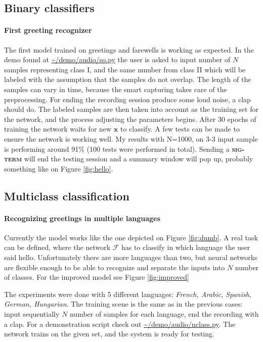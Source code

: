 \subsection{Binary classifiers}
\paragraph{First greeting recognizer}
The first model trained on greetings and farewells is working as expected. In the demo found at \cite{DV} \url{~/demo/audio/so.py} the user is asked to input number of $N$ samples representing class I, and the same number from class II which will be labeled with the assumption that the samples do not overlap. The length of the samples can vary in time, because the smart capturing takes care of the preprocessing. 
For ending the recording session produce some loud noise, a clap should do. 
The labeled samples are then taken into account as the training set for the network, and the process adjusting the parameters begins. 
After 30 epochs of training the network waits for new $\mathbf{x}$ to classify. 
A few tests can be made to ensure the network is working well. 
My results with N=1000, on 3-3 input sample is performing around 91\% (100 tests were performed in total). 
Sending a \textbf{\textsc{sig-term}} will end the testing session and a summary window will pop up, probably something like on Figure \ref{fig:hello}.

\subsection{Multiclass classification}
\paragraph{Recognizing greetings in multiple languages}
Currently the model works like the one depicted on Figure \ref{fig:dumb}. 
A real task can be defined, where the network $\mathcal{F}$ has to classify in which language the user said hello. Unfortunately there are more languages than two, but neural networks are flexible enough to be able to recognize and separate the inputs into  $N$ number of classes. For the improved model see Figure \ref{fig:improved} 

The experiments were done with 5 different languages: \emph{French, Arabic, Spanish, German, Hungarian}. The training scene is the same as in the previous cases: input sequentially $N$ number of samples for each language, end the recording with a clap.
For a demonstration script check out \cite{DV} \url{~/demo/audio/nclass.py}.
The network trains on the given set, and the system is ready for testing.

